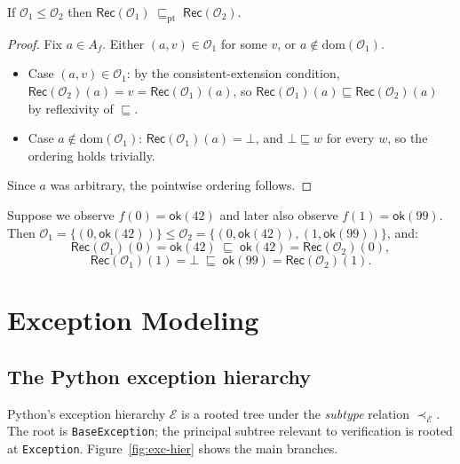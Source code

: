 \documentclass[11pt]{article}
\newcommand{\pdom}{\mathrm{dom}}             %
\newcommand{\Apx}{\sqsubseteq}              %
\newcommand{\POK}[1]{\mathsf{ok}(#1)}      %
\newcommand{\PMR}{\textsc{Pmr}}            %
\newcommand{\ObsSet}{\mathcal{O}}          %
\newcommand{\RecAlg}{\mathsf{Rec}}         %
\newcommand{\ExcH}{\mathcal{E}}            %
\newcommand{\ExcSub}{\prec_{\!\ExcH}}      %
\begin{document}
\begin{lemma}[Monotonicity of \PMR{}]\label{lem:mono}
If $\ObsSet_1 \leq \ObsSet_2$ then
$\RecAlg(\ObsSet_1) \;\Apx_\mathrm{pt}\; \RecAlg(\ObsSet_2)$.
\end{lemma}

\begin{proof}
Fix $a \in A_f$.  Either $(a, v) \in \ObsSet_1$ for some $v$, or
$a \notin \pdom(\ObsSet_1)$.

\begin{itemize}
  \item Case $(a, v) \in \ObsSet_1$: by the consistent-extension
        condition, $\RecAlg(\ObsSet_2)(a) = v = \RecAlg(\ObsSet_1)(a)$,
        so $\RecAlg(\ObsSet_1)(a) \Apx \RecAlg(\ObsSet_2)(a)$ by
        reflexivity of $\Apx$.
  \item Case $a \notin \pdom(\ObsSet_1)$: $\RecAlg(\ObsSet_1)(a) = \bot$,
        and $\bot \Apx w$ for every $w$, so the ordering holds trivially.
\end{itemize}
Since $a$ was arbitrary, the pointwise ordering follows.
\end{proof}

\begin{example}\label{ex:mono}
Suppose we observe $f(0) = \POK{42}$ and later also observe
$f(1) = \POK{99}$.  Then $\ObsSet_1 = \{(0, \POK{42})\} \leq
\ObsSet_2 = \{(0, \POK{42}), (1, \POK{99})\}$, and:
\[
  \RecAlg(\ObsSet_1)(0) = \POK{42} \;\Apx\; \POK{42} = \RecAlg(\ObsSet_2)(0),
\]
\[
  \RecAlg(\ObsSet_1)(1) = \bot \;\Apx\; \POK{99} = \RecAlg(\ObsSet_2)(1).
\]
\end{example}

\section{Exception Modeling}\label{sec:exceptions}

\subsection{The Python exception hierarchy}

Python's exception hierarchy $\ExcH$ is a rooted tree under the
\emph{subtype} relation $\ExcSub$.  The root is
\texttt{BaseException}; the principal subtree relevant to verification
is rooted at \texttt{Exception}.  Figure~\ref{fig:exc-hier} shows the
main branches.
\end{document}
